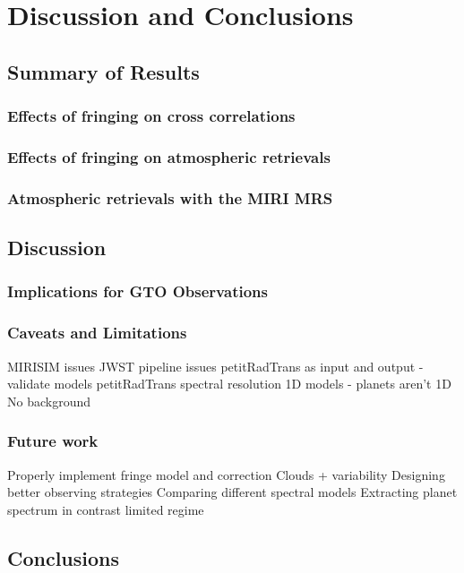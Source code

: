 \chapter{Discussion and Conclusions}
\section{Summary of Results}
\subsection{Effects of fringing on cross correlations}
\subsection{Effects of fringing on atmospheric retrievals}
\subsection{Atmospheric retrievals with the MIRI MRS}
\section{Discussion}
\subsection{Implications for GTO Observations}
\subsection{Caveats and Limitations}
MIRISIM issues
JWST pipeline issues
petitRadTrans as input and output - validate models
petitRadTrans spectral resolution
1D models - planets aren't 1D \parencite{Taylor2020}
No background
\subsection{Future work}
Properly implement fringe model and correction
Clouds + variability
Designing better observing strategies
Comparing different spectral models
Extracting planet spectrum in contrast limited regime
\section{Conclusions}